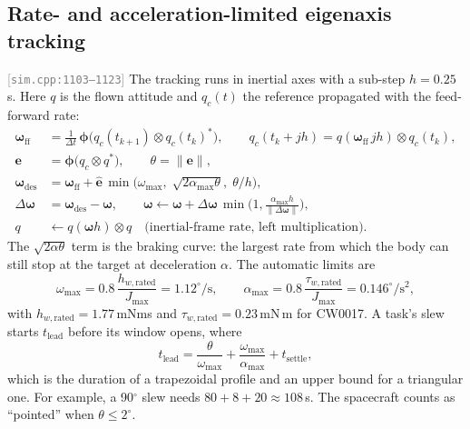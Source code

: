 \documentclass[11pt,a4paper]{article}
\newcommand{\vb}[1]{\boldsymbol{#1}}
\newcommand{\uv}[1]{\hat{\boldsymbol{#1}}}
\newcommand{\src}[1]{\textcolor{gray}{\small[\texttt{#1}]}}
\begin{document}
\subsection{Rate- and acceleration-limited eigenaxis tracking}\label{sec:slew} \src{sim.cpp:1103--1123}
The tracking runs in inertial axes with a sub-step $h = 0.25$\,s. Here $q$ is the flown attitude and $q_c(t)$ the reference propagated with the feed-forward rate:
\begin{align}
\vb\omega_{\text{ff}} &= \frac{1}{\Delta t}\,\vb\phi\big(q_c(t_{k+1})\otimes q_c(t_k)^{*}\big), \qquad q_c(t_k + jh) = q(\vb\omega_{\text{ff}}\,jh)\otimes q_c(t_k),\\
\vb e &= \vb\phi\big(q_c\otimes q^{*}\big),\qquad \theta = \lVert\vb e\rVert, \\
\vb\omega_{\text{des}} &= \vb\omega_{\text{ff}} + \uv e\,\min\!\big(\omega_{\max},\; \sqrt{2\alpha_{\max}\theta},\; \theta/h\big), \label{eq:brake}\\
\Delta\vb\omega &= \vb\omega_{\text{des}} - \vb\omega,\qquad \vb\omega \leftarrow \vb\omega + \Delta\vb\omega\,\min\!\Big(1, \frac{\alpha_{\max}h}{\lVert\Delta\vb\omega\rVert}\Big),\\
q &\leftarrow q(\vb\omega h)\otimes q \quad\text{(inertial-frame rate, left multiplication).}
\end{align}
The $\sqrt{2\alpha\theta}$ term is the braking curve: the largest rate from which the body can still stop at the target at deceleration $\alpha$. The automatic limits are
\begin{equation}
\omega_{\max} = 0.8\,\frac{h_{w,\text{rated}}}{J_{\max}} = 1.12^\circ/\mathrm{s},\qquad
\alpha_{\max} = 0.8\,\frac{\tau_{w,\text{rated}}}{J_{\max}} = 0.146^\circ/\mathrm{s}^2,
\end{equation}
with $h_{w,\text{rated}} = 1.77$\,mNms and $\tau_{w,\text{rated}} = 0.23$\,mN\,m for CW0017. A task's slew starts $t_{\text{lead}}$ before its window opens, where
\begin{equation}
t_{\text{lead}} = \frac{\theta}{\omega_{\max}} + \frac{\omega_{\max}}{\alpha_{\max}} + t_{\text{settle}},
\end{equation}
which is the duration of a trapezoidal profile and an upper bound for a triangular one. For example, a 90$^\circ$ slew needs $80 + 8 + 20 \approx 108$\,s. The spacecraft counts as ``pointed'' when $\theta \le 2^\circ$.
\end{document}
